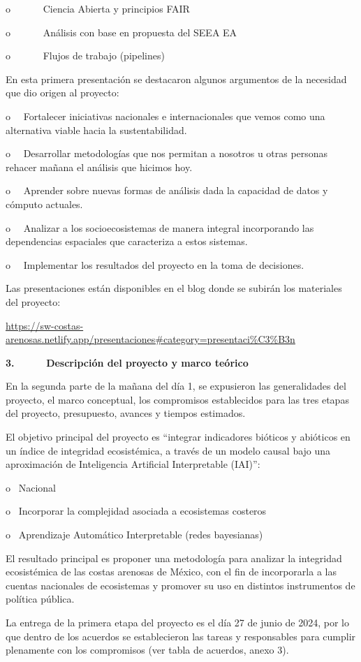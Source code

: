 \documentclass[
  letterpaper,
  DIV=11,
  numbers=noendperiod]{scrreprt}
\begin{document}
o~~~~~~ Ciencia Abierta y principios FAIR

o~~~~~~ Análisis con base en propuesta del SEEA EA

o~~~~~~ Flujos de trabajo (pipelines)

En esta primera presentación se destacaron algunos argumentos de la
necesidad que dio origen al proyecto:

o~~ Fortalecer iniciativas nacionales e internacionales que vemos como
una alternativa viable hacia la sustentabilidad.

o~~ Desarrollar metodologías que nos permitan a nosotros u otras
personas rehacer mañana el análisis que hicimos hoy.

o~~ Aprender sobre nuevas formas de análisis dada la capacidad de datos
y cómputo actuales.

o~~ Analizar a los socioecosistemas de manera integral incorporando las
dependencias espaciales que caracteriza a estos sistemas.

o~~ Implementar los resultados del proyecto en la toma de decisiones.

Las presentaciones están disponibles en el blog donde se subirán los
materiales del proyecto:~

\url{https://sw-costas-arenosas.netlify.app/presentaciones\#category=presentaci\%C3\%B3n}

\textbf{3.~~~~~ Descripción del proyecto y marco teórico}

En la segunda parte de la mañana del día 1, se expusieron las
generalidades del proyecto, el marco conceptual, los compromisos
establecidos para las tres etapas del proyecto, presupuesto, avances y
tiempos estimados.

El objetivo principal del proyecto es ``integrar indicadores bióticos y
abióticos en un índice de integridad ecosistémica, a través de un modelo
causal bajo una aproximación de Inteligencia Artificial Interpretable
(IAI)'':

o~ Nacional

o~ Incorporar la complejidad asociada a ecosistemas costeros

o~ Aprendizaje Automático Interpretable (redes bayesianas)

El resultado principal es proponer una metodología para analizar la
integridad ecosistémica de las costas arenosas de México, con el fin de
incorporarla a las cuentas nacionales de ecosistemas y promover su uso
en distintos instrumentos de política pública.

La entrega de la primera etapa del proyecto es el día 27 de junio de
2024, por lo que dentro de los acuerdos se establecieron las tareas y
responsables para cumplir plenamente con los compromisos (ver tabla de
acuerdos, anexo 3).
\end{document}

